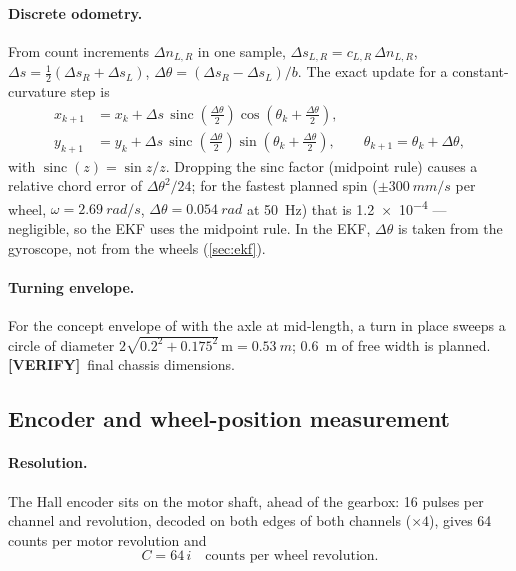 \documentclass[11pt,a4paper]{article}
\newcommand{\mk}[2]{\textsf{\scriptsize\bfseries\colorbox{#1bg}{\color{#1}[#2]}}}
\newcommand{\VERIFY}{\mk{cold}{VERIFY}}
\begin{document}
\paragraph{Discrete odometry.} From count increments $\Delta n_{L,R}$ in one
sample, $\Delta s_{L,R}=c_{L,R}\,\Delta n_{L,R}$,
$\Delta s=\tfrac12(\Delta s_R+\Delta s_L)$, $\Delta\theta=(\Delta s_R-\Delta s_L)/b$.
The exact update for a constant-curvature step is
\begin{equation}
\begin{aligned}
x_{k+1} &= x_k + \Delta s\,\operatorname{sinc}\!\left(\tfrac{\Delta\theta}{2}\right)\cos\!\left(\theta_k+\tfrac{\Delta\theta}{2}\right),\\
y_{k+1} &= y_k + \Delta s\,\operatorname{sinc}\!\left(\tfrac{\Delta\theta}{2}\right)\sin\!\left(\theta_k+\tfrac{\Delta\theta}{2}\right),
\qquad \theta_{k+1}=\theta_k+\Delta\theta,
\end{aligned}\label{eq:odo}
\end{equation}
with $\operatorname{sinc}(z)=\sin z/z$. Dropping the sinc factor (midpoint rule)
causes a relative chord error of $\Delta\theta^2/24$; for the fastest planned
spin ($\pm\qty{300}{mm/s}$ per wheel, $\omega=\qty{2.69}{rad/s}$, $\Delta\theta=\qty{0.054}{rad}$
at \qty{50}{Hz}) that is \num{1.2e-4} --- negligible, so the EKF uses the
midpoint rule. In the EKF, $\Delta\theta$ is taken from the gyroscope, not from
the wheels (\cref{sec:ekf}).

\paragraph{Turning envelope.} For the concept envelope of
 with the axle at mid-length, a turn in place sweeps a
circle of diameter $2\sqrt{0.2^2+0.175^2}\,\text{m}=\qty{0.53}{m}$; \qty{0.6}{m}
of free width is planned. \VERIFY\ final chassis dimensions.

\subsection{Encoder and wheel-position measurement}\label{sec:encoder}

\paragraph{Resolution.} The Hall encoder sits on the motor shaft, ahead of the
gearbox: 16 pulses per channel and revolution, decoded on both edges of both
channels ($\times4$), gives 64 counts per motor revolution and
\begin{equation}
C = 64\,i\quad\text{counts per wheel revolution}.
\end{equation}
\end{document}
